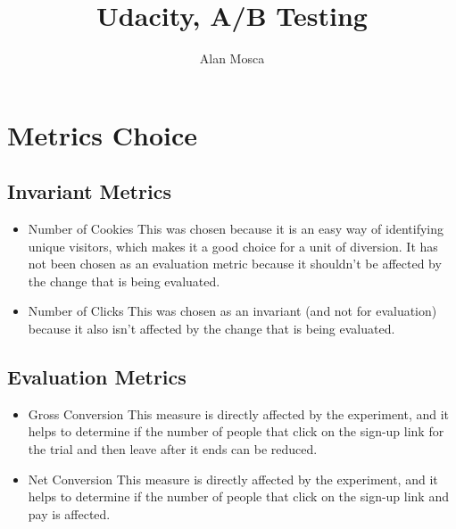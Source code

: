 \documentclass[12pt,a4paper]{article}
\begin{document}
\title{Udacity, A/B Testing}
\author{Alan Mosca}

\maketitle

\section{Metrics Choice}

\subsection{Invariant Metrics}

\begin{itemize}
\item Number of Cookies
This was chosen because it is an easy way of identifying unique visitors, which
makes it a good choice for a unit of diversion. It has not been chosen as an
evaluation metric because it shouldn't be affected by the change that is being
evaluated.

\item Number of Clicks
This was chosen as an invariant (and not for evaluation) because it also isn't
affected by the change that is being evaluated.
\end{itemize}

\subsection{Evaluation Metrics}

\begin{itemize}
\item Gross Conversion
This measure is directly affected by the experiment, and it helps to determine
if the number of people that click on the sign-up link for the trial and then
leave after it ends can be reduced.

\item Net Conversion
This measure is directly affected by the experiment, and it helps to determine
if the number of people that click on the sign-up link and pay is affected.

\end{itemize}
\end{document}
